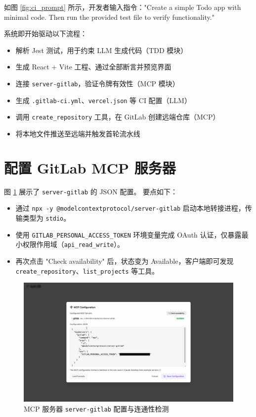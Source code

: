 如图 \ref{fig:ci_prompt} 所示，开发者输入指令："Create a simple Todo app with minimal code. Then run the provided test file to verify functionality."

系统即开始驱动以下流程：

\begin{itemize}
  \item 解析 Jest 测试，用于约束 LLM 生成代码（TDD 模块）
  \item 生成 React + Vite 工程、通过全部断言并预览界面
  \item 连接 \texttt{server-gitlab}，验证令牌有效性（MCP 模块）
  \item 生成 \texttt{.gitlab-ci.yml}、\texttt{vercel.json} 等 CI 配置（LLM）
  \item 调用 \texttt{create\_repository} 工具，在 GitLab 创建远端仓库（MCP）
  \item 将本地文件推送至远端并触发首轮流水线
\end{itemize}

\section{配置 GitLab MCP 服务器}
\label{sec:cicd-mcp-config}

图 \ref{fig:mcp_gitlab_cfg} 展示了 \texttt{server-gitlab} 的 JSON 配置。  
要点如下：

\begin{itemize}
  \item 通过 \texttt{npx -y @modelcontextprotocol/server-gitlab} 启动本地转接进程，传输类型为 \texttt{stdio}。  
  \item 使用 \texttt{GITLAB\_PERSONAL\_ACCESS\_TOKEN} 环境变量完成 OAuth 认证，仅暴露最小权限作用域（\texttt{api\_read\_write}）。  
  \item 再次点击 "Check availability" 后，状态变为 Available，客户端即可发现 \texttt{create\_repository}、\texttt{list\_projects} 等工具。  
\end{itemize}

\begin{figure}[H]
  \centering
  \includegraphics[width=\textwidth]{figures/screenshots/ci-cd/mcp_gitlab_cfg.png}
  \caption{MCP 服务器 \texttt{server-gitlab} 配置与连通性检测}
  \label{fig:mcp_gitlab_cfg}
\end{figure}

